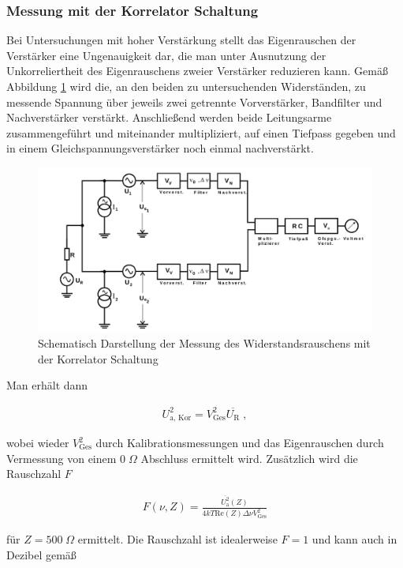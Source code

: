 \subsubsection{Messung mit der Korrelator Schaltung}
Bei Untersuchungen mit hoher Verstärkung stellt das Eigenrauschen der Verstärker eine Ungenauigkeit dar, die man unter Ausnutzung der Unkorreliertheit des Eigenrauschens zweier Verstärker reduzieren kann. Gemäß Abbildung \ref{FIG:KorrelatorSchaltung} wird die, an den beiden zu untersuchenden Widerständen, zu messende Spannung über jeweils zwei getrennte Vorverstärker, Bandfilter und Nachverstärker verstärkt. Anschließend werden beide Leitungsarme zusammengeführt und miteinander multipliziert, auf einen Tiefpass gegeben und in einem Gleichspannungsverstärker noch einmal nachverstärkt.

\begin{figure}[htbp]
	\centering
	\includegraphics[width=0.8\linewidth,height=0.5\textheight,keepaspectratio]{bilder/KorrelatorSchaltung.png}
	\caption{Schematisch Darstellung der Messung des Widerstandsrauschens mit der Korrelator Schaltung \cite{Anl}}
	\label{FIG:KorrelatorSchaltung}
\end{figure}

Man erhält dann

\begin{align}
U^2_{\textrm{a, Kor}} = V_{\textrm{Ges}}^2 \overline{U_{\textrm{R}}} \;,
\end{align}

wobei wieder $V_{\textrm{Ges}}^2$ durch Kalibrationsmessungen und das Eigenrauschen durch Vermessung von einem $0\;\Omega$ Abschluss ermittelt wird. Zusätzlich wird die Rauschzahl $F$

\begin{align}
F(\nu, Z) = \frac{\overline{U^2_{\textrm{a}}}(Z)}{4kT \textrm{Re}(Z) \Delta\nu V_{\textrm{Ges}}^2}
\label{eq:F}
\end{align}

für $Z = 500\; \Omega$ ermittelt. Die Rauschzahl ist idealerweise $F = 1$ und kann auch in Dezibel gemäß

